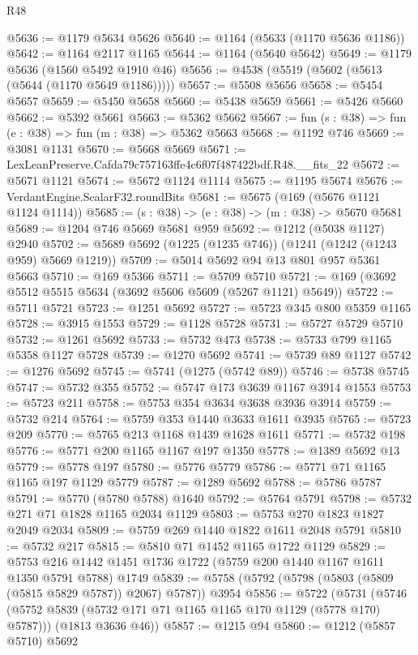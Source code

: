 \begin{lexlean}{R48}
\begin{coremodule}
@5636 := @1179 @5634 @5626
@5640 := @1164 (@5633 (@1170 @5636 @1186))
@5642 := @1164 @2117 @1165
@5644 := @1164 (@5640 @5642)
@5649 := @1179 @5636 (@1560 @5492 @1910 @46)
@5656 := @4538 (@5519 (@5602 (@5613 (@5644 (@1170 @5649 @1186)))))
@5657 := @5508 @5656
@5658 := @5454 @5657
@5659 := @5450 @5658
@5660 := @5438 @5659
@5661 := @5426 @5660
@5662 := @5392 @5661
@5663 := @5362 @5662
@5667 := fun (s : @38) => fun (e : @38) => fun (m : @38) => @5362 @5663
@5668 := @1192 @746
@5669 := @3081 @1131
@5670 := @5668 @5669
@5671 := LexLeanPreserve.Cafda79c757163ffe4c6f07f487422bdf.R48.__fits_22
@5672 := @5671 @1121
@5674 := @5672 @1124 @1114
@5675 := @1195 @5674
@5676 := VerdantEngine.ScalarF32.roundBits
@5681 := @5675 (@169 (@5676 @1121 @1124 @1114))
@5685 := (s : @38) -> (e : @38) -> (m : @38) -> @5670 @5681
@5689 := @1204 @746 @5669 @5681 @959
@5692 := @1212 (@5038 @1127) @2940
@5702 := @5689 @5692 (@1225 (@1235 @746)) (@1241 (@1242 (@1243 @959) @5669 @1219))
@5709 := @5014 @5692 @94 @13 @801 @957 @5361 @5663
@5710 := @169 @5366
@5711 := @5709 @5710
@5721 := @169 (@3692 @5512 @5515 @5634 (@3692 @5606 @5609 (@5267 @1121) @5649))
@5722 := @5711 @5721
@5723 := @1251 @5692
@5727 := @5723 @345 @800 @5359 @1165
@5728 := @3915 @1553
@5729 := @1128 @5728
@5731 := @5727 @5729 @5710
@5732 := @1261 @5692
@5733 := @5732 @473
@5738 := @5733 @799 @1165 @5358 @1127 @5728
@5739 := @1270 @5692
@5741 := @5739 @89 @1127
@5742 := @1276 @5692
@5745 := @5741 (@1275 (@5742 @89))
@5746 := @5738 @5745
@5747 := @5732 @355
@5752 := @5747 @173 @3639 @1167 @3914 @1553
@5753 := @5723 @211
@5758 := @5753 @354 @3634 @3638 @3936 @3914
@5759 := @5732 @214
@5764 := @5759 @353 @1440 @3633 @1611 @3935
@5765 := @5723 @209
@5770 := @5765 @213 @1168 @1439 @1628 @1611
@5771 := @5732 @198
@5776 := @5771 @200 @1165 @1167 @197 @1350
@5778 := @1389 @5692 @13
@5779 := @5778 @197
@5780 := @5776 @5779
@5786 := @5771 @71 @1165 @1165 @197 @1129 @5779
@5787 := @1289 @5692
@5788 := @5786 @5787
@5791 := @5770 (@5780 @5788) @1640
@5792 := @5764 @5791
@5798 := @5732 @271 @71 @1828 @1165 @2034 @1129
@5803 := @5753 @270 @1823 @1827 @2049 @2034
@5809 := @5759 @269 @1440 @1822 @1611 @2048 @5791
@5810 := @5732 @217
@5815 := @5810 @71 @1452 @1165 @1722 @1129
@5829 := @5753 @216 @1442 @1451 @1736 @1722 (@5759 @200 @1440 @1167 @1611 @1350 @5791 @5788) @1749
@5839 := @5758 (@5792 (@5798 (@5803 (@5809 (@5815 @5829 @5787)) @2067) @5787)) @3954
@5856 := @5722
    (@5731
      (@5746 (@5752 @5839 (@5732 @171 @71 @1165 @1165 @170 @1129 (@5778 @170) @5787)))
      (@1813 @3636 @46))
@5857 := @1215 @94
@5860 := @1212 (@5857 @5710) @5692

\end{coremodule}
\end{lexlean}
